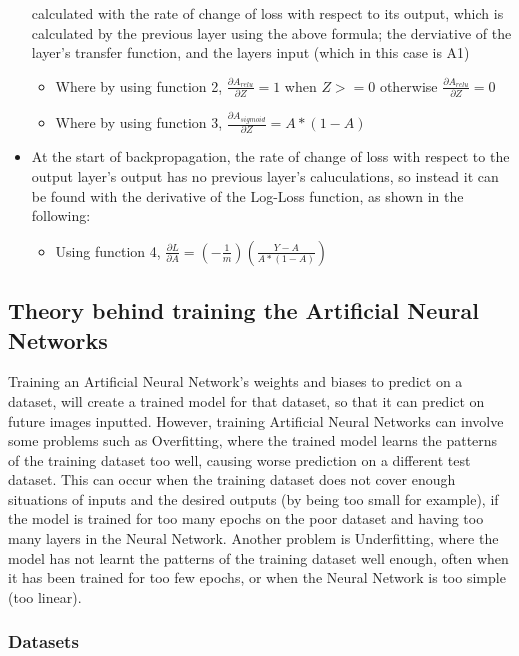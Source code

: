 \documentclass[./project-report/src/latex/project-report.tex]{subfiles}
\begin{document}
\begin{itemize}
          calculated with the rate of change of loss with respect to its output, which is calculated by the previous layer using the above formula; the derviative of 
          the layer's transfer function, and the layers input (which in this case is A1)
    \begin{itemize}
        \item Where by using function 2, $\frac{\partial{A_{relu}}}{\partial{Z}} = 1$ when $Z >= 0$ otherwise $\frac{\partial{A_{relu}}}{\partial{Z}} = 0$
        \item Where by using function 3, $\frac{\partial{A_{sigmoid}}}{\partial{Z}} = A * (1 - A)$
    \end{itemize}
    \item At the start of backpropagation, the rate of change of loss with respect to the output layer's output has no previous layer's caluculations, so instead it can 
          be found with the derivative of the Log-Loss function, as shown in the following:
    \begin{itemize}
        \item Using function 4, $\frac{\partial{L}}{\partial{A}} = (-\frac{1}{m})(\frac{Y-A}{A * (1-A)})$
    \end{itemize}
\end{itemize}

\subsection{Theory behind training the Artificial Neural Networks}

Training an Artificial Neural Network's weights and biases to predict on a dataset, will create a trained model for that dataset, so that it can predict on future 
images inputted. However, training Artificial Neural Networks can involve some problems such as Overfitting, where the trained model learns the patterns of the 
training dataset too well, causing worse prediction on a different test dataset. This can occur when the training dataset does not cover enough situations of inputs 
and the desired outputs (by being too small for example), if the model is trained for too many epochs on the poor dataset and having too many layers in the Neural 
Network. Another problem is Underfitting, where the model has not learnt the patterns of the training dataset well enough, often when it has been trained for too few 
epochs, or when the Neural Network is too simple (too linear).

\subsubsection{Datasets}
\vspace{5mm}
\end{document}
